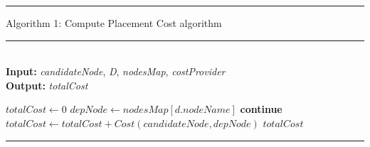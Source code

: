\documentclass{article}
\begin{document}
\noindent\rule{\linewidth}{0.4pt}
Algorithm 1: Compute Placement Cost algorithm \\
\vspace{-0.5em}
\rule{\linewidth}{0.4pt} \\
\textbf{Input:} \textit{candidateNode}, \textit{D}, \textit{nodesMap}, \textit{costProvider} \\
\textbf{Output:} \textit{totalCost}
\begin{algorithmic}[1]
\STATE $totalCost \leftarrow 0$
    \STATE $depNode \leftarrow nodesMap[d.nodeName]$
        \STATE \textbf{continue}
    \ENDIF
    \STATE $totalCost \leftarrow totalCost + Cost(candidateNode, depNode)$
\ENDFOR
\RETURN $totalCost$
\end{algorithmic}
\vspace{-0.5em}
\rule{\linewidth}{0.4pt}
\vspace{1em}
\end{document}
